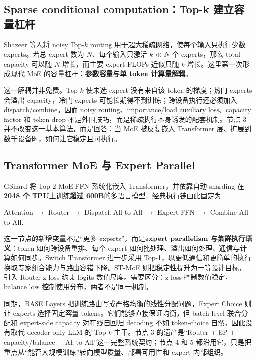 \documentclass[10pt,a4paper,fontset=none]{ctexart}
\newcommand{\term}[1]{\textbf{#1}}
\begin{document}
\subsection{Sparse conditional computation：Top-k 建立容量杠杆}

Shazeer 等人将 noisy Top-$k$ routing 用于超大稀疏网络\cite{zh:shazeer2017outrageously}，使每个输入只执行少数 experts。若总 expert 数为 $N$、每个输入只激活 $k\ll N$ 个 experts，那么 total capacity 可以随 $N$ 增长，而主要 expert FLOPs 近似只随 $k$ 增长。这里第一次形成现代 MoE 的容量杠杆：\term{参数容量与单 token 计算量解耦}。

这一解耦并非免费。Top-$k$ 使未选 expert 没有来自该 token 的梯度；热门 experts 会溢出 capacity，冷门 experts 可能长期得不到训练；跨设备执行还必须加入 dispatch/combine。因而 noisy routing、importance/load auxiliary loss、capacity factor 和 token drop 不是外围技巧，而是稀疏执行本身诱发的配套机制。节点 3 并不改变这一基本算法，而是回答：当 MoE 被反复嵌入 Transformer 层、扩展到数千设备时，如何让它稳定且可执行。

\subsection{Transformer MoE 与 Expert Parallel}

GShard 将 Top-2 MoE FFN 系统化嵌入 Transformer，并依靠自动 sharding 在\textbf{2048 个 TPU}上训练\textbf{超过 600B}的多语言模型\cite{zh:lepikhin2020gshard}。经典执行链由此固定为
\begin{center}
\textsf{Attention $\rightarrow$ Router $\rightarrow$ Dispatch All-to-All $\rightarrow$ Expert FFN $\rightarrow$ Combine All-to-All}.
\end{center}
这一节点的新增变量不是“更多 experts”，而是\term{expert parallelism 与集群执行语义}：token 如何跨设备重排、每个 expert 如何批处理、溢出如何处理、通信与计算如何同步。Switch Transformer 进一步采用 Top-1，以更低通信和更简单的执行换取专家组合能力与路由容错下降\cite{zh:fedus2021switch}。ST-MoE 则把稳定性提升为一等设计目标，引入 Router z-loss 约束 logits 数值尺度\cite{zh:zoph2022stmoe}。需要区分：z-loss 控制数值稳定，balance loss 控制使用分布，两者不是同一机制。

同期，BASE Layers 把训练路由写成严格均衡的线性分配问题\cite{zh:lewis2021base}，Expert Choice 则让 experts 选择固定容量 tokens\cite{zh:zhou2022expertchoice}。它们能够直接保证均衡，但 batch-level 联合分配和 expert-side capacity 对在线自回归 decoding 不如 token-choice 自然，因此没有取代 decoder-only LLM 的 Top-$k$ 主干。节点 3 的遗产是“Router + EP + capacity/balance + All-to-All”这一完整系统契约；节点 4 和 5 都沿用它，只是把重点从“能否大规模训练”转向模型质量、部署可用性和 expert 内部组织。
\end{document}
